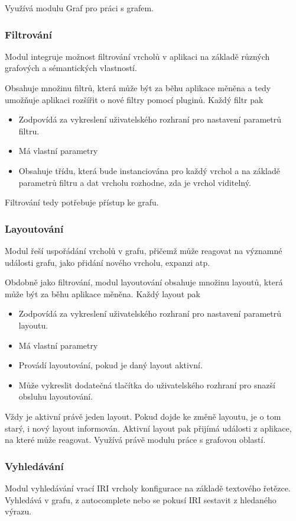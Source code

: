 Využívá modulu Graf pro práci s grafem.

\subsubsection{Filtrování}
Modul integruje možnost filtrování vrcholů v aplikaci na základě různých grafových a sémantických vlastností.

Obsahuje množinu filtrů, která může být za běhu aplikace měněna a tedy umožňuje aplikaci rozšířit o nové filtry pomocí pluginů. Každý filtr pak
\begin{itemize}
    \item Zodpovídá za vykreslení uživatelského rozhraní pro nastavení parametrů filtru.
    \item Má vlastní parametry
    \item Obsahuje třídu, která bude instanciována pro každý vrchol a na základě parametrů filtru a dat vrcholu rozhodne, zda je vrchol viditelný.
\end{itemize}

Filtrování tedy potřebuje přístup ke grafu.

\subsubsection{Layoutování}
Modul řeší uspořádání vrcholů v grafu, přičemž může reagovat na významné události grafu, jako přidání nového vrcholu, expanzi atp.

Obdobně jako filtrování, modul layoutování obsahuje množinu layoutů, která může být za běhu aplikace měněna. Každý layout pak
\begin{itemize}
    \item Zodpovídá za vykreslení uživatelského rozhraní pro nastavení parametrů layoutu.
    \item Má vlastní parametry
    \item Provádí layoutování, pokud je daný layout aktivní.
    \item Může vykreslit dodatečná tlačítka do uživatelského rozhraní pro snazší obsluhu layoutování.
\end{itemize}

Vždy je aktivní právě jeden layout. Pokud dojde ke změně layoutu, je o tom starý, i nový layout informován. Aktivní layout pak přijímá události z aplikace, na které může reagovat. Využívá právě modulu práce s grafovou oblastí.

\subsubsection{Vyhledávání}
Modul vyhledávání vrací IRI vrcholy konfigurace na základě textového řetězce. Vyhledává v grafu, z autocomplete nebo se pokusí IRI sestavit z hledaného výrazu.

